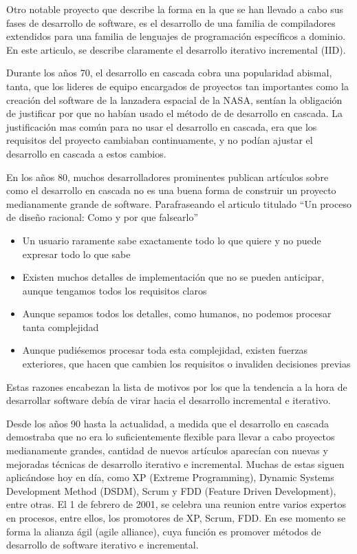 \documentclass[12pt]{report} %
\begin{document}
Otro notable proyecto que describe la forma en la que se han llevado a cabo sus
fases de desarrollo de software, es el desarrollo de una familia de compiladores
extendidos para una familia de lenguajes de programación específicos a dominio.
En este articulo, se describe claramente el desarrollo iterativo incremental
(IID). \cite{6312870}

Durante los años 70, el desarrollo en cascada cobra una popularidad abismal,
tanta, que los lideres de equipo encargados de proyectos tan importantes como la
creación del software de la lanzadera espacial de la NASA, sentían la obligación
de justificar por que no habían usado el método de de desarrollo en cascada.  La
justificación mas común para no usar el desarrollo en cascada, era que los
requisitos del proyecto cambiaban continuamente, y no podían ajustar el
desarrollo en cascada a estos cambios.

En los años 80, muchos desarrolladores prominentes publican artículos sobre como
el desarrollo en cascada no es una buena forma de construir un proyecto
medianamente grande de software.  Parafraseando el articulo titulado ``Un
proceso de diseño racional: Como y por que falsearlo'' \cite{Parnas1986}
\begin{itemize} \item{Un usuario raramente sabe exactamente todo lo que quiere y
    no puede expresar todo lo que sabe} \item{Existen muchos detalles de
      implementación que no se pueden anticipar, aunque tengamos todos los
      requisitos claros} \item{Aunque sepamos todos los detalles, como humanos,
      no podemos procesar tanta complejidad} \item{Aunque pudiésemos procesar
        toda esta complejidad, existen fuerzas exteriores, que hacen que cambien
        los requisitos o invaliden decisiones previas} \end{itemize} Estas
        razones encabezan la lista de motivos por los que la tendencia a la hora
        de desarrollar software debía de virar hacia el desarrollo incremental e
        iterativo.

Desde los años 90 hasta la actualidad, a medida que el desarrollo en cascada
demostraba que no era lo suficientemente flexible para llevar a cabo proyectos
medianamente grandes, cantidad de nuevos artículos aparecían con nuevas y
mejoradas técnicas de desarrollo iterativo e incremental.  Muchas de estas
siguen aplicándose hoy en día, como XP (Extreme Programming), Dynamic Systems
Development Method (DSDM), Scrum y FDD (Feature Driven Development), entre
otras.  El 1 de febrero de 2001, se celebra una reunion entre varios expertos en
procesos, entre ellos, los promotores de XP, Scrum, FDD.  En ese momento se
forma la alianza ágil (agile alliance), cuya función es promover métodos de
desarrollo de software iterativo e incremental. 
\end{document}
